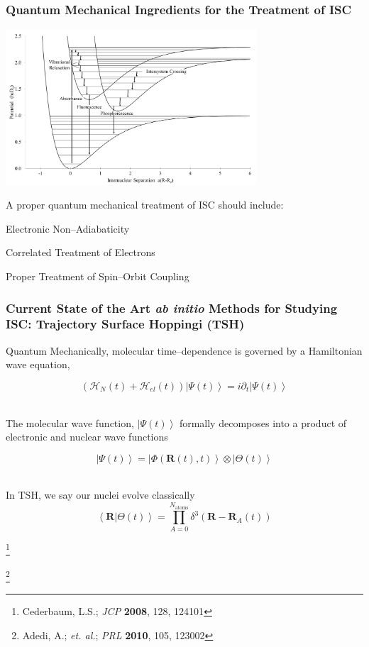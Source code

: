 \documentclass[usepdftitle=false,10pt]{beamer}
\newcommand{\bpar}[1]{\left( #1 \right)}                  %
\newcommand{\ket}[1]{\left\vert #1 \right\rangle}         %
\newcommand{\inner}[2]{\left\langle #1 \left\vert\right. #2 \right\rangle}            %
\newcommand*\vc[1]{\boldsymbol{#1}}
\newcommand*\op[1]{\mathcal{#1}}
\newcommand\blfootnote[1]{%
  \begingroup
  \renewcommand\thefootnote{}\footnote{#1}%
  \addtocounter{footnote}{-1}%
  \endgroup
}
\begin{document}
\begin{frame}
  \frametitle{Quantum Mechanical Ingredients for the Treatment of ISC}
  \begin{center}
  \includegraphics[width=0.7\textwidth]{ISC} 
  \end{center}
  \vspace{-0.5cm}
  A proper quantum mechanical treatment of ISC should include:\\
  \begin{mylist}
    \item Electronic Non--Adiabaticity
    \item Correlated Treatment of Electrons
    \item Proper Treatment of Spin--Orbit Coupling
  \end{mylist}
\end{frame}

\begin{frame}
  \frametitle{Current State of the Art \emph{ab initio} Methods for Studying 
  ISC: Trajectory Surface Hoppingi (TSH)}

  Quantum Mechanically, molecular time--dependence is governed by a Hamiltonian
  wave equation,

  \begin{equation*}
    \bpar{\op{H}_N(t) + \op{H}_{el}(t)} \ket{\Psi (t)} = i\partial_t \ket{\Psi(t)}
  \end{equation*}

  ~\\
  The molecular wave function, $\ket{\Psi(t)}$ formally decomposes into a product
  of electronic and nuclear wave functions

  \begin{equation*} 
    \ket{\Psi (t)} = \ket{\Phi(\vc{R}(t),t)}\otimes\ket{\Theta(t)} 
  \end{equation*} 

  ~\\
  In TSH, we say our nuclei evolve classically
  \begin{equation*}
    \inner{\vc{R}}{\Theta (t)} = \prod_{A = 0}^{N_\mathrm{atoms}} 
    \delta^3(\vc{R} - \vc{R}_A(t))
  \end{equation*}

  \vspace{-0.5cm}
  \blfootnote{\tiny Cederbaum, L.S.; \emph{JCP} \textbf{2008}, 128, 124101}
  \blfootnote{\tiny Adedi, A.; \emph{et. al.}; \emph{PRL} \textbf{2010}, 105, 123002}
\end{frame}
\end{document}
